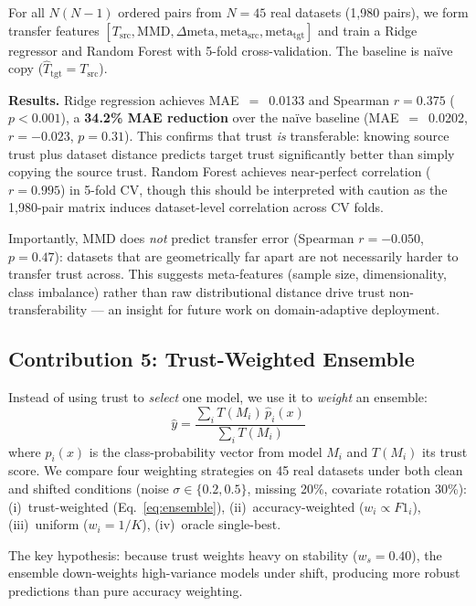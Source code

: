 \documentclass[10pt]{article}
\begin{document}
For all $N(N{-}1)$ ordered pairs from $N{=}45$ real datasets (1{,}980 pairs), we form transfer features $[T_\text{src}, \text{MMD}, \Delta\text{meta}, \text{meta}_\text{src}, \text{meta}_\text{tgt}]$ and train a Ridge regressor and Random Forest with 5-fold cross-validation. The baseline is na\"{i}ve copy ($\hat{T}_\text{tgt} = T_\text{src}$).

\textbf{Results.} Ridge regression achieves MAE~$=$~0.0133 and Spearman $r{=}0.375$ ($p{<}0.001$), a \textbf{34.2\% MAE reduction} over the na\"{i}ve baseline (MAE~$=$~0.0202, $r{=}{-}0.023$, $p{=}0.31$). This confirms that trust \emph{is} transferable: knowing source trust plus dataset distance predicts target trust significantly better than simply copying the source trust. Random Forest achieves near-perfect correlation ($r{=}0.995$) in 5-fold CV, though this should be interpreted with caution as the 1{,}980-pair matrix induces dataset-level correlation across CV folds.

Importantly, MMD does \emph{not} predict transfer error (Spearman $r{=}{-}0.050$, $p{=}0.47$): datasets that are geometrically far apart are not necessarily harder to transfer trust across. This suggests meta-features (sample size, dimensionality, class imbalance) rather than raw distributional distance drive trust non-transferability — an insight for future work on domain-adaptive deployment.

\subsection{Contribution 5: Trust-Weighted Ensemble}
\label{sec:ensemble}

Instead of using trust to \emph{select} one model, we use it to \emph{weight} an ensemble:
\begin{equation}
\hat{y} = \frac{\sum_i T(M_i)\,\hat{p}_i(x)}{\sum_i T(M_i)}
\label{eq:ensemble}
\end{equation}
where $\hat{p}_i(x)$ is the class-probability vector from model $M_i$ and $T(M_i)$ its trust score. We compare four weighting strategies on 45 real datasets under both clean and shifted conditions (noise $\sigma{\in}\{0.2, 0.5\}$, missing 20\%, covariate rotation 30\%):
(i)~trust-weighted (Eq.~\ref{eq:ensemble}),
(ii)~accuracy-weighted ($w_i \propto F1_i$),
(iii)~uniform ($w_i = 1/K$),
(iv)~oracle single-best.

The key hypothesis: because trust weights heavy on stability ($w_s{=}0.40$), the ensemble down-weights high-variance models under shift, producing more robust predictions than pure accuracy weighting.
\end{document}
